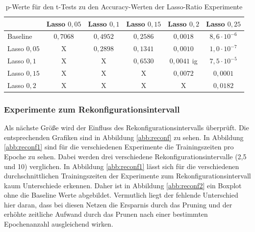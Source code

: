 \begin{table}[]
\caption{p-Werte für den t-Tests zu den Accuracy-Werten der Lasso-Ratio Experimente}
\centering
\begin{tabular}{l|c|c|c|c|c|}
\cline{2-6}
                                & \multicolumn{1}{l|}{Lasso $0,05$} & \multicolumn{1}{l|}{Lasso $0,1$} & \multicolumn{1}{l|}{Lasso $0,15$} & \multicolumn{1}{l|}{Lasso $0,2$} & \multicolumn{1}{l|}{Lasso $0,25$} \\ \hline
\multicolumn{1}{|l|}{Baseline}   & \cellcolor[HTML]{FE0000}$0,7068$  & \cellcolor[HTML]{FE0000}$0,4952$ & \cellcolor[HTML]{FE0000}$0,2586$  & $0,0018$                         & $8,6\cdot 10^{-6}$     \\ \hline
\multicolumn{1}{|l|}{Lasso $0,05$}& X                               & \cellcolor[HTML]{FE0000}$0,2898$ & \cellcolor[HTML]{FE0000}$0,1341$  & $0,0010$                       & $1,0\cdot 10^{-7}$    \\ \hline
\multicolumn{1}{|l|}{Lasso $0,1$} & X                               & X                              & \cellcolor[HTML]{FE0000}$0,6530$   & $0,0041$         ig              & $7,5\cdot10^{-5}$    \\ \hline
\multicolumn{1}{|l|}{Lasso $0,15$}& X                               & X                              & X                               & $0,0072$                       & $0,0001$                       \\ \hline
\multicolumn{1}{|l|}{Lasso $0,2$} & X                               & X                              & X                               & X                              & $0,0182$                         \\ \hline
\end{tabular}
\label{tab:lasso2}
\end{table}



\subsubsection{Experimente zum Rekonfigurationsintervall}
 Als nächste Größe wird der Einfluss des Rekonfigurationsintervalls überprüft. Die entsprechenden Grafiken sind in Abbildung \ref{abb:reconf} zu sehen. In Abbildung \ref{abb:reconf1} sind für die verschiedenen Experimente die Trainingszeiten pro Epoche zu sehen. Dabei werden drei verschiedene Rekonfigurationsintervalle (2,5 und 10) verglichen. In Abbildung \ref{abb:reconf1} lässt sich für die verschiedenen durchschnittlichen Trainingszeiten der Experimente zum Rekonfigurationsintervall kaum Unterschiede erkennen. Daher ist in Abbildung \ref{abb:reconf2} ein Boxplot ohne die Baseline Werte abgebildet. Vermutlich liegt der fehlende Unterschied hier daran, dass bei diesen Netzen die Ersparnis durch das Pruning und der erhöhte zeitliche Aufwand durch das Prunen nach einer bestimmten Epochenanzahl ausgleichend wirken. 
 
